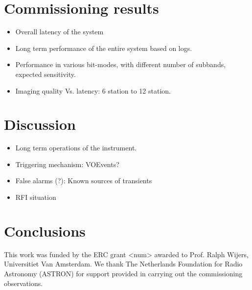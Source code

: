 \documentclass{aa}
\begin{document}
\section {\label{sec:results} Commissioning results}
\begin {itemize}
 \item {Overall latency of the system}
 \item {Long term performance of the entire system based on logs.}
 \item {Performance  in various  bit-modes, with  different number  of subbands,
   expected sensitivity.}
 \item {Imaging quality Vs. latency: 6 station to 12 station.}
\end {itemize}

\section {\label{sec:discussion} Discussion}
\begin {itemize}
 \item {Long term operations of the instrument.}
 \item {Triggering mechanism: VOEvents?}
 \item {False alarms (?): Known sources of transients}
 \item {RFI situation}
\end {itemize}

\section {\label{sec:conclusion} Conclusions}

\begin {acknowledgements}

This work  was funded  by the ERC  grant <num> awarded  to Prof.   Ralph Wijers,
Universitiet  Van Amsterdam.   We  thank The  Netherlands  Foundation for  Radio
Astronomy  (ASTRON)  for support  provided  in  carrying out  the  commissioning
observations.
\end{acknowledgements}


\end{document}
